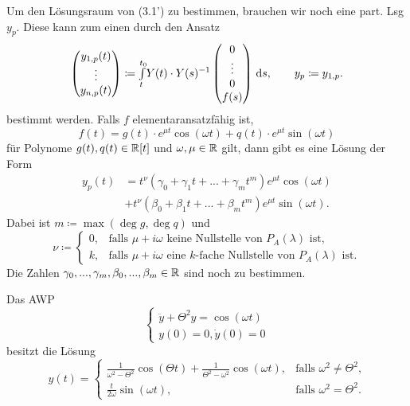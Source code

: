 \documentclass{cheat-sheet}
\begin{document}
\begin{bem}
  Um den Lösungsraum von (3.1') zu bestimmen, brauchen wir noch eine part. Lsg $y_p$.
  Diese kann zum einen durch den Ansatz
  \[
    \begin{pmatrix}
      y_{1,p}(t)\\
      \vdots\\
      y_{n,p}(t)
    \end{pmatrix} \coloneqq {\textstyle \int\limits_{t}^{t_0}} Y(t) \cdot Y(s)^{-1} \begin{pmatrix}
      0\\ \vdots \\ 0 \\ f(s)
    \end{pmatrix} \,\mathrm{d} s, \qquad
    y_p \coloneqq y_{1,p}.
  \]
  bestimmt werden. Falls $f$ elementaransatzfähig ist, \dh{}
  \[ f(t) = g(t) \cdot e^{\mu t} \cos(\omega t) + q(t) \cdot e^{\mu t} \sin(\omega t) \]
  für Polynome $g(t), q(t) \in \mathbb{R}[t]$ und $\omega, \mu \in \mathbb{R}$ gilt, dann gibt es eine Lösung der Form
  \begin{align*}
    y_p(t) &= t^{\nu} (\gamma_0 + \gamma_1 t + ... + \gamma_m t^m) e^{\mu t} \cos(\omega t)\\
    & + t^{\nu} (\beta_0 + \beta_1 t + ... + \beta_m t^m) e^{\mu t} \sin(\omega t).
  \end{align*}
  Dabei ist $m \coloneqq \max(\deg g, \deg q)$ und
  \[
    \nu \coloneqq \begin{cases}
      0, & \text{falls $\mu + i \omega$ keine Nullstelle von $P_A(\lambda)$ ist,}\\
      k, & \text{falls $\mu + i \omega$ eine $k$-fache Nullstelle von $P_A(\lambda)$ ist}.
    \end{cases}
  \]
  Die Zahlen $\gamma_0, ..., \gamma_m, \beta_0, ..., \beta_m \in \mathbb{R}$ sind noch zu bestimmen.
\end{bem}

\begin{bsp}
  Das AWP
  \[
    \left\{ \begin{array}{ll}
      \ddot{y} + \Theta^2 y = \cos(\omega t)\\
      y(0) = 0, \dot{y}(0) = 0
    \end{array} \right.
  \]
  besitzt die Lösung
  \[
    y(t) = \begin{cases}
      \tfrac{1}{\omega^2 - \Theta^2} \cos(\Theta t) + \tfrac{1}{\Theta^2 - \omega^2} \cos(\omega t), &\text{falls $\omega^2 \not= \Theta^2$,}\\
      \tfrac{t}{2 \omega} \sin(\omega t), &\text{falls $\omega^2 = \Theta^2$.}
    \end{cases}
  \]
\end{bsp}
\end{document}
